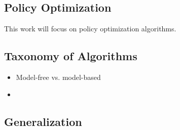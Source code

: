 \subsection{Policy Optimization}

This work will focus on policy optimization algorithms.

\subsection{Taxonomy of Algorithms}

\begin{itemize}
    \item Model-free vs. model-based
    \item 
\end{itemize}

\subsection{Generalization}


